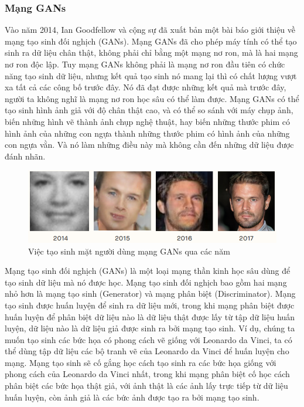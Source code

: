 \subsubsection{Mạng GANs}\label{sec:base_knowledge_gans}
Vào năm 2014, Ian Goodfellow và cộng sự đã xuất bản một bài báo \cite{gans_base} giới thiệu về mạng tạo sinh đối nghịch (GANs). Mạng GANs đã cho phép máy tính có thể tạo sinh ra dữ liệu chân thật, không phải chỉ bằng một mạng nơ ron, mà là hai mạng nơ ron độc lập. Tuy mạng GANs không phải là mạng nơ ron đầu tiên có chức năng tạo sinh dữ liệu, nhưng kết quả tạo sinh nó mang lại thì có chất lượng vượt xa tất cả các công bố trước đây. Nó đã đạt được những kết quả mà trước đây, người ta không nghĩ là mạng nơ ron học sâu có thể làm được. Mạng GANs có thể tạo sinh hình ảnh giả với độ chân thật cao, và có thể so sánh với máy chụp ảnh, biến những hình vẽ thành ảnh chụp nghệ thuật, hay biến những thước phim có hình ảnh của những con ngựa thành những thước phim có hình ảnh của những con ngựa vằn. Và nó làm những điều này mà không cần đến những dữ liệu được đánh nhãn.

\begin{figure}[H]
    \centering
    \includegraphics[width=15cm]{./content/materials/gans-faces.png}
    \caption{Việc tạo sinh mặt người dùng mạng GANs qua các năm \cite{gans_faces}}
\end{figure}

Mạng tạo sinh đối nghịch (GANs) là một loại mạng thần kinh học sâu dùng để tạo sinh dữ liệu mà nó được học. Mạng tạo sinh đối nghịch bao gồm hai mạng nhỏ hơn là mạng tạo sinh (Generator) và mạng phân biệt (Discriminator). Mạng tạo sinh được huấn luyện để sinh ra dữ liệu mới, trong khi mạng phân biệt được huấn luyện để phân biệt dữ liệu nào là dữ liệu thật được lấy từ tập dữ liệu huấn luyện, dữ liệu nào là dữ liệu giả được sinh ra bởi mạng tạo sinh. Ví dụ, chúng ta muốn tạo sinh các bức họa có phong cách vẽ giống với Leonardo da Vinci, ta có thể dùng tập dữ liệu các bộ tranh vẽ của Leonardo da Vinci để huấn luyện cho mạng. Mạng tạo sinh sẽ cố gắng học cách tạo sinh ra các bức họa giống với phong cách của Leonardo da Vinci nhất, trong khi mạng phân biệt cố  học cách phân biệt các bức họa thật giả, với ảnh thật là các ảnh lấy trực tiếp từ dữ liệu huấn luyện, còn ảnh giả là các bức ảnh được tạo ra bởi mạng tạo sinh.

